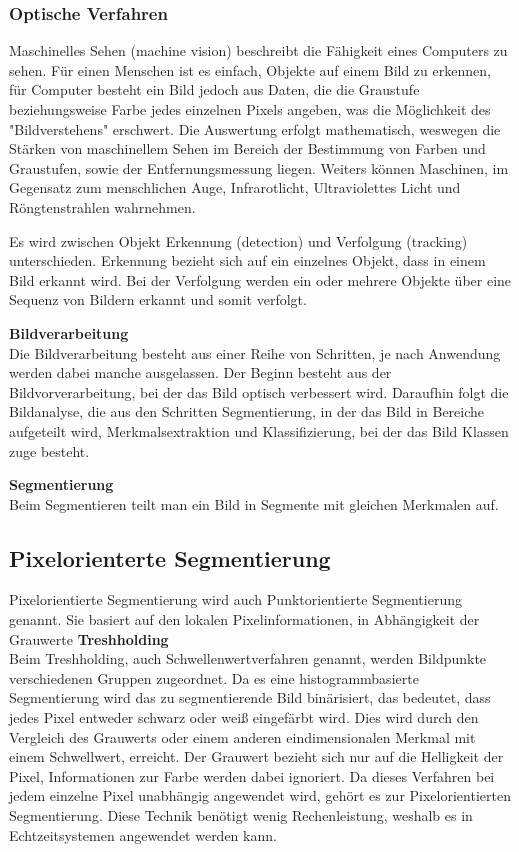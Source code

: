     \subsubsection{Optische Verfahren}
    Maschinelles Sehen (machine vision) beschreibt die Fähigkeit eines Computers zu sehen.
    Für einen Menschen ist es einfach, Objekte auf einem Bild zu erkennen, für Computer besteht ein Bild jedoch aus Daten, die die Graustufe beziehungsweise Farbe jedes einzelnen Pixels angeben, was die Möglichkeit des "Bildverstehens" erschwert.
    Die Auswertung erfolgt mathematisch, weswegen die Stärken von maschinellem Sehen im Bereich der Bestimmung von Farben und Graustufen, sowie der Entfernungsmessung liegen. Weiters können Maschinen, im Gegensatz zum menschlichen Auge, Infrarotlicht, Ultraviolettes Licht und Röngtenstrahlen wahrnehmen. \cite{machinevision} \cite{machinevision2}

    Es wird zwischen Objekt Erkennung (detection) und Verfolgung (tracking) unterschieden. Erkennung bezieht sich auf ein einzelnes Objekt, dass in einem Bild erkannt wird. Bei der Verfolgung werden ein oder mehrere Objekte über eine Sequenz von Bildern erkannt und somit verfolgt.
    \cite{obj_det_trak}

    \textbf{Bildverarbeitung}\\
    Die Bildverarbeitung besteht aus einer Reihe von Schritten, je nach Anwendung werden dabei manche ausgelassen.
    Der Beginn besteht aus der Bildvorverarbeitung, bei der das Bild optisch verbessert wird. Daraufhin folgt die Bildanalyse, die aus den Schritten Segmentierung, in der das Bild in Bereiche aufgeteilt wird, Merkmalsextraktion und Klassifizierung, bei der das Bild Klassen zuge besteht. \cite{Bildverarbeitung} \cite{Bildverarbeitung2}

    \textbf{Segmentierung}\\
    Beim Segmentieren teilt man ein Bild in Segmente mit gleichen Merkmalen auf.

    \subsection*{Pixelorienterte Segmentierung}
    Pixelorientierte Segmentierung wird auch Punktorientierte Segmentierung genannt. Sie basiert auf den lokalen Pixelinformationen, in Abhängigkeit der Grauwerte \cite{Seg_punkt}
    \textbf{Treshholding}\\
    Beim Treshholding, auch Schwellenwertverfahren genannt, werden Bildpunkte verschiedenen Gruppen zugeordnet. Da es eine histogrammbasierte Segmentierung wird das zu segmentierende Bild binärisiert, das bedeutet, dass jedes Pixel entweder schwarz oder weiß eingefärbt wird. Dies wird durch den Vergleich des Grauwerts oder einem anderen eindimensionalen Merkmal mit einem Schwellwert, erreicht. Der Grauwert bezieht sich nur auf die Helligkeit der Pixel, Informationen zur Farbe werden dabei ignoriert. Da dieses Verfahren bei jedem einzelne Pixel unabhängig angewendet wird, gehört es zur Pixelorientierten Segmentierung. Diese Technik benötigt wenig Rechenleistung, weshalb es in Echtzeitsystemen angewendet werden kann.

